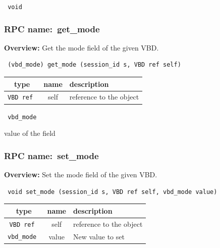 \vspace{0.3cm}

{\tt 
void
}



\vspace{0.3cm}
\vspace{0.3cm}
\vspace{0.3cm}
\subsubsection{RPC name:~get\_mode}

{\bf Overview:} 
Get the mode field of the given VBD.

\begin{verbatim} (vbd_mode) get_mode (session_id s, VBD ref self)\end{verbatim}



 
\vspace{0.3cm}
\begin{tabular}{|c|c|p{7cm}|}
 \hline
{\bf type} & {\bf name} & {\bf description} \\ \hline
{\tt VBD ref } & self & reference to the object \\ \hline 

\end{tabular}

\vspace{0.3cm}

{\tt 
vbd\_mode
}


value of the field
\vspace{0.3cm}
\vspace{0.3cm}
\vspace{0.3cm}
\subsubsection{RPC name:~set\_mode}

{\bf Overview:} 
Set the mode field of the given VBD.

\begin{verbatim} void set_mode (session_id s, VBD ref self, vbd_mode value)\end{verbatim}



 
\vspace{0.3cm}
\begin{tabular}{|c|c|p{7cm}|}
 \hline
{\bf type} & {\bf name} & {\bf description} \\ \hline
{\tt VBD ref } & self & reference to the object \\ \hline 

{\tt vbd\_mode } & value & New value to set \\ \hline 

\end{tabular}

